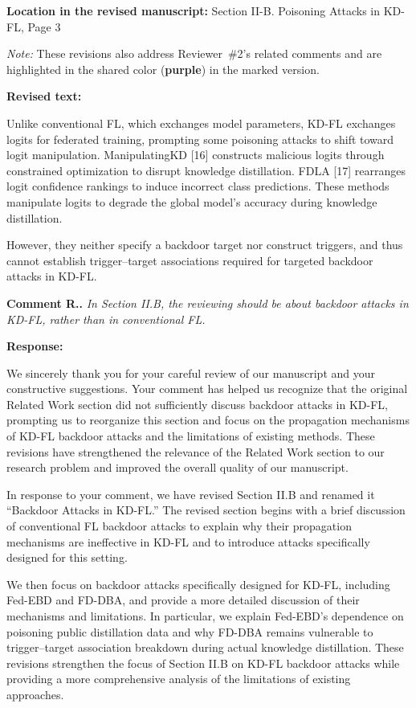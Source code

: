 \documentclass[11pt,a4paper]{article}
\newcommand{\manualindent}{\par\noindent\hspace*{1.5em}\ignorespaces}
\newcounter{reviewernum}
\newcounter{commentnum}
\newcommand{\reviewcomment}[1]{%
  \stepcounter{commentnum}%
  \begin{tcolorbox}[
      enhanced,breakable,colback=black!3,colframe=black!20,
      boxrule=0.5pt,arc=1.2mm,left=9pt,right=9pt,top=8pt,bottom=8pt]
    {\bfseries Comment R\arabic{reviewernum}.\arabic{commentnum}.}\quad
    {\itshape #1}
  \end{tcolorbox}%
}
\newcommand{\authorresponse}[1]{%
  {\bfseries\color{replyblue}Response:}\par
  #1\par\vspace{0.35em}%
}
\newcommand{\revisedtext}[2]{%
  {\bfseries\color{headingnavy}Location in the revised manuscript:} #1\par
  \begin{tcolorbox}[
      enhanced,breakable,colback=replyblue!3,colframe=replyblue!18,
      before upper={\setlength{\parskip}{6pt}},
      borderline west={2.5pt}{0pt}{replyblue},
      boxrule=0.5pt,arc=1mm,left=11pt,right=9pt,top=8pt,bottom=8pt]
    {\bfseries\color{headingnavy}Revised text:}\par
    #2
  \end{tcolorbox}
  \vspace{0.35em}%
}
\begin{document}
\revisedtext{Section II-B. Poisoning Attacks in KD-FL, Page 3 \par \noindent \textit{Note:} These revisions also address Reviewer~\#2's related comments and are highlighted in the shared color (\textcolor{share}{\textbf{purple}}) in the marked version.}{\manualindent Unlike conventional FL, which exchanges model parameters, KD-FL exchanges logits for federated training, prompting some poisoning attacks to shift toward logit manipulation.
ManipulatingKD [16] constructs malicious logits through constrained optimization to disrupt knowledge distillation.
FDLA [17] rearranges logit confidence rankings to induce incorrect class predictions.
These methods manipulate logits to degrade the global model's accuracy during knowledge distillation. 

\manualindent However, they neither specify a backdoor target nor construct triggers, and thus cannot establish trigger–target associations required for targeted backdoor attacks in KD-FL.}

\reviewcomment{ In Section II.B, the reviewing should be about backdoor attacks in KD-FL, rather than in conventional FL.}

\authorresponse{\manualindent We sincerely thank you for your careful review of our manuscript and your constructive suggestions.
Your comment has helped us recognize that the original Related Work section did not sufficiently discuss backdoor attacks in KD-FL, prompting us to reorganize this section and focus on the propagation mechanisms of KD-FL backdoor attacks and the limitations of existing methods.
These revisions have strengthened the relevance of the Related Work section to our research problem and improved the overall quality of our manuscript.

\manualindent In response to your comment, we have revised Section II.B and renamed it “Backdoor Attacks in KD-FL.” 
The revised section begins with a brief discussion of conventional FL backdoor attacks to explain why their propagation mechanisms are ineffective in KD-FL and to introduce attacks specifically designed for this setting.

\manualindent We then focus on backdoor attacks specifically designed for KD-FL, including Fed-EBD and FD-DBA, and provide a more detailed discussion of their mechanisms and limitations. 
In particular, we explain Fed-EBD's dependence on poisoning public distillation data and why FD-DBA remains vulnerable to trigger–target association breakdown during actual knowledge distillation. 
These revisions strengthen the focus of Section II.B on KD-FL backdoor attacks while providing a more comprehensive analysis of the limitations of existing approaches.}
\end{document}
